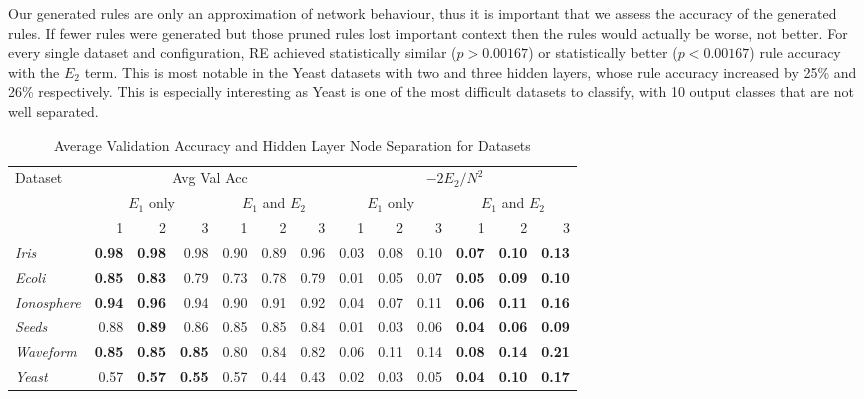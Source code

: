 
Our generated rules are only an approximation of network behaviour,
thus it is important that we assess the accuracy of the generated rules.
If fewer rules were generated but those pruned rules
lost important context then the rules would actually be worse, not better.
For every single dataset and configuration, RE achieved
statistically similar ($p > 0.00167$) or statistically better ($p < 0.00167$)
rule accuracy with the $E_2$ term. This is most
notable in the Yeast datasets with two and three hidden layers, whose rule
accuracy increased by 25\% and 26\% respectively. This is especially interesting
as Yeast is one of the most difficult datasets to classify, with 10 output
classes that are not well separated. 

\begin{table*}[t!]
  \centering
  \small
  \begin{tabular}{|l|r|r|r|r|r|r|r|r|r|r|r|r|}
    \hline
    Dataset & 
    \multicolumn{6}{c|}{Avg Val Acc} & 
    \multicolumn{6}{c|}{$-2E_2/N^2$} \\
    \cline{2-13}
    & \multicolumn{3}{c|}{$E_1$ only} &
    \multicolumn{3}{c|}{$E_1$ and $E_2$} &
    \multicolumn{3}{c|}{$E_1$ only} &
    \multicolumn{3}{c|}{$E_1$ and $E_2$} \\
    \cline{2-13}
    & 1 & 2 & 3 & 1 & 2 & 3 & 1 & 2 & 3 & 1 & 2 & 3 \\
    \hline
    \textit{Iris} & \textbf{0.98} & \textbf{0.98} & 0.98 & 0.90 & 0.89 & 0.96 & 0.03 &0.08 & 0.10 & \textbf{0.07} & \textbf{0.10} & \textbf{0.13} \\
    \textit{Ecoli} & \textbf{0.85} & \textbf{0.83} & 0.79 & 0.73 & 0.78 & 0.79 & 0.01 & 0.05 & 0.07 & \textbf{0.05} & \textbf{0.09} & \textbf{0.10} \\
    \textit{Ionosphere} & \textbf{0.94} & \textbf{0.96} & 0.94 & 0.90 & 0.91 & 0.92 & 0.04 & 0.07 & 0.11 & \textbf{0.06} & \textbf{0.11} & \textbf{0.16} \\
    \textit{Seeds} & 0.88 & \textbf{0.89} & 0.86 & 0.85 & 0.85 & 0.84 & 0.01 & 0.03 & 0.06 & \textbf{0.04} & \textbf{0.06} & \textbf{0.09} \\
    \textit{Waveform} & \textbf{0.85} & \textbf{0.85} & \textbf{0.85} & 0.80 & 0.84 & 0.82 & 0.06 & 0.11 & 0.14 & \textbf{0.08} & \textbf{0.14} & \textbf{0.21} \\
    \textit{Yeast} & 0.57 & \textbf{0.57} & \textbf{0.55} & 0.57 & 0.44 & 0.43 & 0.02 & 0.03 & 0.05 & \textbf{0.04} & \textbf{0.10} & \textbf{0.17} \\
    \hline
  \end{tabular}
  \caption{Average Validation Accuracy and Hidden Layer Node Separation for Datasets }
  \label{tab:e1_e2_avgs}  
\end{table*}

